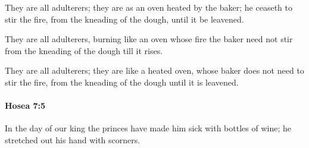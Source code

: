			\begin{versebox}
					\item[BHS] 
					\item[LXX] 
					\item[ASV] They are all adulterers; they are as an oven heated by the baker; he ceaseth to stir the fire, from the kneading of the dough, until it be leavened.
					\item[NIV] They are all adulterers, burning like an oven whose fire the baker need not stir from the kneading of the dough till it rises.
					\item[NRSV] They are all adulterers; they are like a heated oven, whose baker does not need to stir the fire, from the kneading of the dough until it is leavened.
			\end{versebox}

		\paragraph{Hosea 7:5} %
			\label{HOSEA-7-5}

			In the day of our king the princes have made him sick with bottles of wine; he stretched out his hand with scorners.

